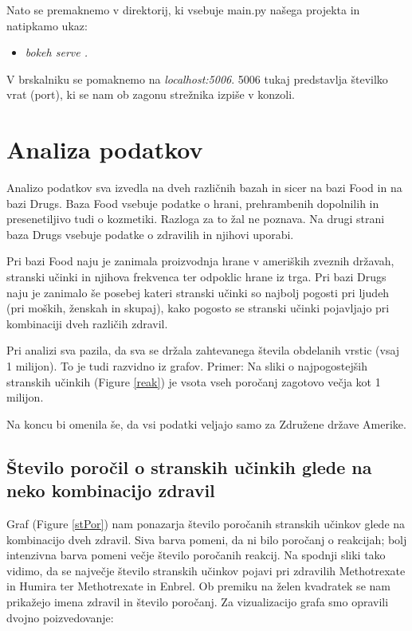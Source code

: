 \documentclass[a4paper,10pt]{article}
\begin{document}
Nato se premaknemo v direktorij, ki vsebuje main.py našega projekta in natipkamo ukaz: 
\begin{itemize}
\item{\textit{bokeh serve .} }
\end{itemize} 
V brskalniku se pomaknemo na \textit{localhost:5006}. 5006 tukaj predstavlja številko vrat (port), ki se nam ob zagonu strežnika izpiše v konzoli. 

\section{Analiza podatkov}
Analizo podatkov sva izvedla na dveh različnih bazah in sicer na bazi Food in na bazi Drugs. Baza Food vsebuje podatke o hrani, prehrambenih dopolnilih in presenetiljivo tudi o kozmetiki. Razloga za to žal ne poznava. Na drugi strani baza Drugs vsebuje podatke o zdravilih in njihovi uporabi.
 
Pri bazi Food naju je zanimala proizvodnja hrane v ameriških zveznih državah, stranski učinki in njihova frekvenca ter odpoklic hrane iz trga.
Pri bazi Drugs naju je zanimalo še posebej kateri stranski učinki so najbolj pogosti pri ljudeh (pri moških, ženskah in skupaj), kako pogosto se stranski učinki pojavljajo pri kombinaciji dveh različih zdravil.

Pri analizi sva pazila, da sva se držala zahtevanega števila obdelanih vrstic (vsaj 1 milijon). To je tudi razvidno iz grafov. Primer: Na sliki o najpogostejših stranskih učinkih  (Figure \ref{reak}) je vsota vseh poročanj zagotovo večja kot 1 milijon.

Na koncu bi omenila še, da vsi podatki veljajo samo za Združene države Amerike.


\subsection{Število poročil o stranskih učinkih glede na neko kombinacijo zdravil}
Graf (Figure \ref{stPor}) nam ponazarja število poročanih stranskih učinkov glede na kombinacijo dveh zdravil. Siva barva pomeni, da ni bilo poročanj o reakcijah; bolj intenzivna barva pomeni večje število poročanih reakcij. Na spodnji sliki tako vidimo, da se največje število stranskih učinkov pojavi pri zdravilih Methotrexate in Humira ter Methotrexate in Enbrel. Ob premiku na želen kvadratek se nam prikažejo imena zdravil in število poročanj.
Za vizualizacijo grafa smo opravili dvojno poizvedovanje:
\end{document}
